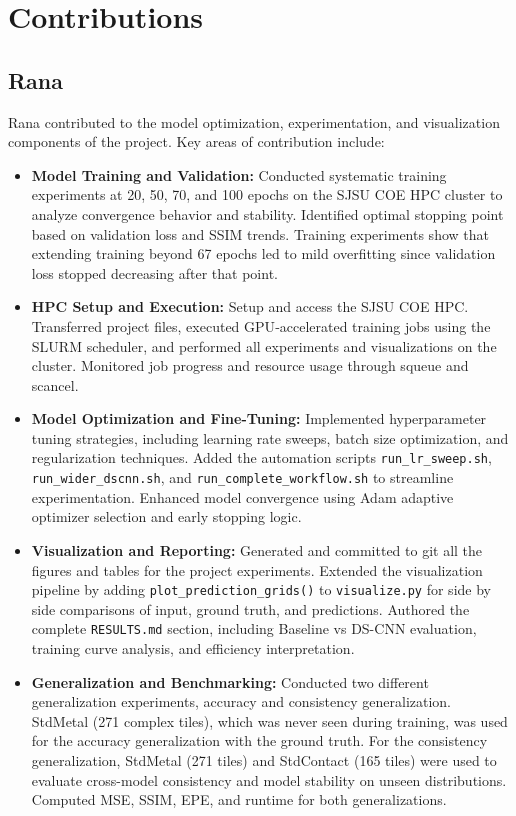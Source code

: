 \documentclass[conference]{IEEEtran}
\begin{document}
\section{\textbf{Contributions}}
\subsection{\textbf{Rana}}
Rana contributed to the model optimization, experimentation, and visualization components of the project. Key areas of contribution include:

\begin{itemize}
    \item \textbf{Model Training and Validation:} Conducted systematic training experiments at 20, 50, 70, and 100 epochs on the SJSU COE HPC cluster to analyze convergence behavior and stability. Identified optimal stopping point based on validation loss and SSIM trends. Training experiments show that extending training beyond 67 epochs led to mild overfitting since validation loss stopped decreasing after that point. 
    
    \item \textbf{HPC Setup and Execution:} Setup and access the SJSU COE HPC. Transferred project files, executed GPU‑accelerated training jobs using the SLURM scheduler, and performed all experiments and visualizations on the cluster. Monitored job progress and resource usage through squeue and scancel.
    
    \item \textbf{Model Optimization and Fine-Tuning:} Implemented hyperparameter tuning strategies, including learning rate sweeps, batch size optimization, and regularization techniques. Added the automation scripts \texttt{run\_lr\_sweep.sh}, \texttt{run\_wider\_dscnn.sh}, and \texttt{run\_complete\_workflow.sh} to streamline experimentation. Enhanced model convergence using Adam adaptive optimizer selection and early stopping logic.
    
    \item \textbf{Visualization and Reporting:} Generated and committed to git all the figures and tables for the project experiments. Extended the visualization pipeline by adding \texttt{plot\_prediction\_grids()} to \texttt{visualize.py} for side by side comparisons of input, ground truth, and predictions. Authored the complete \texttt{RESULTS.md} section, including Baseline vs DS-CNN evaluation, training curve analysis, and efficiency interpretation.
    
    \item \textbf{Generalization and Benchmarking:} Conducted two different generalization experiments, accuracy and consistency generalization. StdMetal (271 complex tiles), which was never seen during training, was used for the accuracy generalization with the ground truth. For the consistency generalization, StdMetal (271 tiles) and StdContact (165 tiles) were used to evaluate cross-model consistency and model stability on unseen distributions. Computed MSE, SSIM, EPE, and runtime for both generalizations.
    

\end{itemize}
\end{document}
